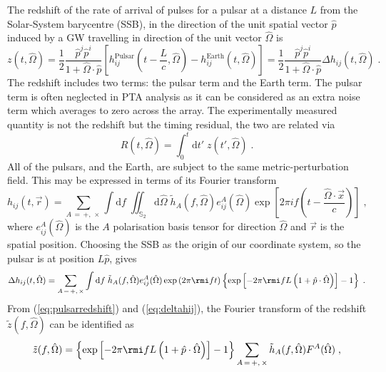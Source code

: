 The redshift of the rate of arrival of pulses for a pulsar at a distance $L$ from the Solar-System barycentre (SSB), in the direction of the unit spatial vector $\hat{p}$ induced by a GW travelling in direction of the unit vector $\hat{\Omega}$ is \citep{anholm-2009}
\begin{equation}\label{eq:pulsarredshift}
z(t,\hat{\Omega})= \frac{1}{2} \frac{\hat{p}^{j}\hat{p}^{i}} {1+\hat{\Omega}\cdot\hat{p}}\left[h_{ij}^{\mathrm{Pulsar}}\left(t-\frac{L}{c},\hat{\Omega} \right)-h_{ij}^{\mathrm{Earth}}(t,\hat{\Omega} )\right] = \frac{1}{2}\frac{\hat{p}^{j}\hat{p}^{i}}{1+\hat{\Omega}\cdot\hat{p}} \Delta h_{ij}(t,\hat{\Omega})\; .
\end{equation}
The redshift includes two terms: the pulsar term and the Earth term. The pulsar term is often neglected in PTA analysis as it can be considered as an extra noise term which averages to zero across the array. The experimentally measured quantity is not the redshift but the timing residual, the two are related via
\begin{equation}\label{eq:restored}
R(t,\hat{\Omega}) = \int_{0}^{t}\mathrm{d}t'\;z(t',\hat{\Omega}) \; .
\end{equation}
All of the pulsars, and the Earth, are subject to the same metric-perturbation field. This may be expressed in terms of its Fourier transform
\begin{equation}
h_{ij}(t,\vec{r}) = \sum_{A\,=\,+,\,\times}\int\mathrm{d}f\;\iint_{\mathbb{S}_{2}}\mathrm{d}\hat{\Omega}\; \tilde{h}_{A}(f,\hat{\Omega})e_{ij}^{A}(\hat{\Omega}) \exp\left[2\pi i f \left(t-\frac{\hat{\Omega}\cdot\vec{x}}{c}\right)\right] \; ,
\end{equation}
where $e^{A}_{ij}(\hat{\Omega})$ is the $A$ polarisation basis tensor for direction $\hat{\Omega}$  and $\vec{r}$ is the spatial position. Choosing the SSB as the origin of our coordinate system, so the pulsar is at position $L\hat{p}$, gives
\begin{equation}\label{eq:deltahij}
\Delta h_{ij}(t,\hat{\Omega}) = \sum_{A\,=\,+,\,\times}\int\mathrm{d}f\; \tilde{h}_{A}(f,\hat{\Omega})e_{ij}^{A}(\hat{\Omega})\exp\left(2\pi \rmi f t\right)\left\{\exp\left[-2\pi\rmi fL \left(1+\hat{p}\cdot\hat{\Omega}\right)\right]-1\right\} \; .
\end{equation}
From (\ref{eq:pulsarredshift}) and (\ref{eq:deltahij}), the Fourier transform of the redshift $\tilde{z}(f,\hat{\Omega})$ can be identified as
\begin{equation}\label{eq:45}
\tilde{z}(f,\hat{\Omega}) = \left\{\exp\left[-2\pi\rmi fL \left(1+\hat{p}\cdot\hat{\Omega}\right)\right]-1\right\} \sum_{A\,=\,+,\,\times} \tilde{h}_{A}(f,\hat{\Omega})F^{A}(\hat{\Omega}) \; ,
\end{equation}

